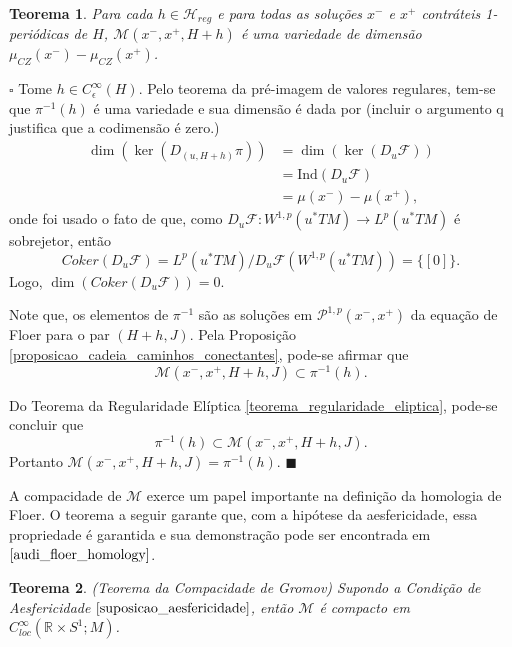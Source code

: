 \documentclass[12pt]{book}
\newtheorem{teorema}{Teorema}[section]
\newenvironment{prova}[1]{$\square$ #1}{\hfill$\blacksquare$}
\newcommand{\caminhosexponenciaisconectantes}[2]{\mathcal{P}^{1,p}(#1, #2)}
\newcommand{\caminhosexponenciaisconectantespadrao}{\caminhosexponenciaisconectantes{x^{-}}{x^{+}}}
\newcommand{\circulo}{S^{1}}
\newcommand{\classe}[1]{[#1]}
\newcommand{\diferencialfloerponto}[1]{D_{#1}\operadorFloer}
\newcommand{\energiafinitaM}{\mathcal{M}}
\newcommand{\energiafinitaMconectanteHamiltoniana}{\energiafinitaM(x^{-}, x^{+},H+h,J)}
\newcommand{\espacoLp}[1]{L^{p}(#1)}
\newcommand{\espacosobolev}[1]{W^{1,p}(#1)}
\newcommand{\hamiltonianasRegulares}{\mathcal{H}_{reg}}
\newcommand{\iconley}[1]{\iconleyabrev(#1)}
\newcommand{\iconleyabrev}{\mu_{CZ}}
\newcommand{\ind}{\text{Ind}}
\newcommand{\operadorFloer}{\mathcal{F}}
\newcommand{\perturbacaoHamiltoniana}[1]{C^{\infty}_{\epsilon}(#1)}
\newcommand{\pullbackfibradotangente}[2]{#1^{*}T#2}
\newcommand{\pullbackfibradotangenteM}[1]{\pullbackfibradotangente{#1}{M}}
\newcommand{\retacartesianocirculo}{\real{} \times \circulo}
\newcommand{\real}[1]{\mathbb{R}^{#1}}
\newcommand{\alerta}[1]{{\color{red}#1}}
\begin{document}
	\begin{teorema}\label{teorema_variedade_espaco_trajetoria}
		Para cada $h \in \hamiltonianasRegulares$ e para todas as soluções $x^{-}$ e $x^{+}$ contráteis 1-periódicas de $H$, $\energiafinitaM(x^{-}, x^{+}, H+h)$ é uma variedade de dimensão $\iconley{x^{-}}-\iconley{x^{+}}$.
	\end{teorema}
	\begin{prova} Tome $h \in \perturbacaoHamiltoniana{H}$. Pelo teorema da pré-imagem de valores regulares, tem-se que $\pi^{-1}(h)$ é uma variedade e sua dimensão é dada por \alerta{(incluir o argumento q justifica que a codimensão é zero.)}
			$$
			\begin{aligned}
			\dim(\ker(D_{(u, H+h)}\pi)) &= \dim(\ker(\diferencialfloerponto{u}))
			\\
			&=\ind{(\diferencialfloerponto{u})}
			\\
			&=\mu(x^{-})-\mu(x^{+}),
			\end{aligned}
			$$
		onde foi usado o fato de que, como  $\diferencialfloerponto{u}: \espacosobolev{\pullbackfibradotangenteM{u}} \to \espacoLp{\pullbackfibradotangenteM{u}}$  é sobrejetor, então 
		$$
		Coker(\diferencialfloerponto{u}) = \espacoLp{\pullbackfibradotangenteM{u}}/\diferencialfloerponto{u}( \espacosobolev{\pullbackfibradotangenteM{u}})=\{\classe{0}\}.$$
		Logo, $\dim(Coker(\diferencialfloerponto{u})) = 0$.
		
		Note que, os elementos de $\pi^{-1}$ são as soluções em $\caminhosexponenciaisconectantespadrao$ da equação de Floer para o par $(H+h, J)$. Pela Proposição \ref{proposicao_cadeia_caminhos_conectantes}, pode-se afirmar que 
			$$
			\energiafinitaMconectanteHamiltoniana \subset\pi^{-1}(h).
			$$
			
			Do Teorema da Regularidade Elíptica \ref{teorema_regularidade_eliptica}, pode-se concluir que 
			$$
			\pi^{-1}(h) \subset\energiafinitaMconectanteHamiltoniana.
			$$
			Portanto $\energiafinitaMconectanteHamiltoniana =\pi^{-1}(h)$.
	\end{prova}
	
	A compacidade de $\energiafinitaM$ exerce um papel importante na definição da homologia de Floer. O teorema a seguir garante que, com a hipótese da aesfericidade, essa propriedade é garantida e sua demonstração pode ser encontrada em $\cite{audi_floer_homology}$.
	
	\begin{teorema}\label{teorema_compacidade_gromov}
		(Teorema da Compacidade de Gromov) Supondo a Condição de Aesfericidade $\ref{suposicao_aesfericidade}$, então $\energiafinitaM$ é compacto em $C^{\infty}_{loc}(\retacartesianocirculo; M)$.
	\end{teorema}
	
\end{document}
